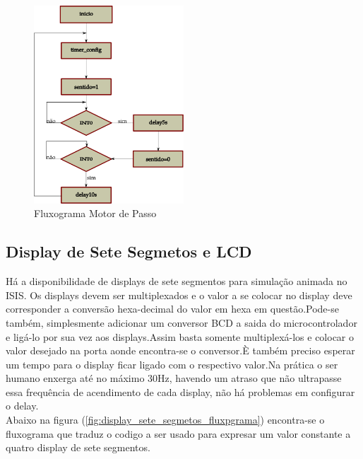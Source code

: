 \documentclass{Fabiano_file}
\begin{document}
{\begin{figure}[h!]
\centering
\includegraphics[width=0.5\textwidth]{fluoxograma_motor_de_passo.pdf}
\caption{Fluxograma Motor de Passo}
\label{fig:fluoxograma_motor_de_passo}
\end{figure}

\pagebreak

\subsection{Display de Sete Segmetos e LCD}
Há a disponibilidade de displays de sete segmentos para simulação animada no ISIS. Os displays devem ser multiplexados e o valor a se colocar no display
deve corresponder a conversão hexa-decimal do valor em hexa em questão.Pode-se também, simplesmente adicionar um conversor BCD a saida do microcontrolador e 
ligá-lo por sua vez aos displays.Assim basta somente multiplexá-los e colocar o valor desejado na porta aonde encontra-se o conversor.È também preciso esperar 
um tempo para o display ficar ligado com o respectivo valor.Na prática o ser humano enxerga até no máximo 30Hz, havendo um atraso que não ultrapasse essa 
frequência de acendimento de cada display, não há problemas em configurar o delay.\\

Abaixo na figura (\ref{fig:display_sete_segmetos_fluxpgrama}) encontra-se o fluxograma que traduz o codigo a ser usado para expresar um valor constante a quatro display de sete segmentos.

}
\end{document}
